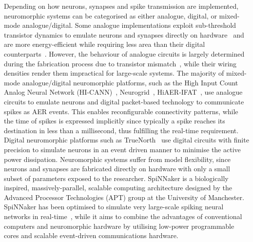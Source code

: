 \documentclass{frontiersENG} %
\begin{document}
Depending on how neurons, synapses and spike transmission are implemented, neuromorphic systems can be categorised as either analogue, digital, or mixed-mode analogue/digital. %
Some analogue implementations exploit sub-threshold transistor dynamics to emulate neurons and synapses directly on hardware~\citep{indiveri2011neuromorphic} and are more energy-efficient while requiring less area than their digital counterparts~\citep{joubert2012hardware}. However, the behaviour of analogue circuits is largely determined during the fabrication process due to transistor mismatch~\citep{indiveri2011neuromorphic,pedram2006thermal,linares2003compact}, while their wiring densities render them impractical for large-scale systems. The majority of mixed-mode analogue/digital neuromorphic platforms, such as the High Input Count Analog Neural Network (HI-CANN)~\citep{schemmel2010wafer}, Neurogrid~\citep{benjamin2014neurogrid}, HiAER-IFAT~\citep{yu201265k}, use analogue circuits to emulate neurons and digital packet-based technology to communicate spikes as AER events. This enables reconfigurable connectivity patterns, while the time of spikes is expressed implicitly since typically a spike reaches its destination in less than a millisecond, thus fulfilling the real-time requirement. Digital neuromorphic platforms such as TrueNorth~\citep{merolla2014million} use digital circuits with finite precision to simulate neurons in an event driven manner to minimise the active power dissipation. Neuromorphic systems suffer from model flexibility, since neurons and synapses are fabricated directly on hardware with only a small subset of parameters exposed to the researcher. 
SpiNNaker is a biologically inspired, massively-parallel, scalable computing architecture designed by the Advanced Processor Technologies (APT) group at the University of Manchester. SpiNNaker has been optimised to simulate very large-scale spiking neural networks in real-time~\citep{furber2014spinnaker}, while it aims to combine the advantages of conventional computers and neuromorphic hardware by utilising low-power programmable cores and scalable event-driven communications hardware.
\end{document}
